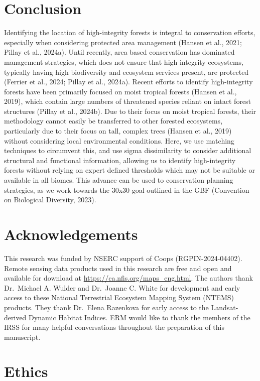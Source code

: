\documentclass[
]{agujournal2019}
\begin{document}
\section{Conclusion}\label{conclusion}

Identifying the location of high-integrity forests is integral to
conservation efforts, especially when considering protected area
management (Hansen et al., 2021; Pillay et al., 2024a). Until recently,
area based conservation has dominated management strategies, which does
not ensure that high-integrity ecosystems, typically having high
biodiversity and ecosystem services present, are protected (Ferrier et
al., 2024; Pillay et al., 2024a). Recent efforts to identify
high-integrity forests have been primarily focused on moist tropical
forests (Hansen et al., 2019), which contain large numbers of threatened
species reliant on intact forest structures (Pillay et al., 2024b). Due
to their focus on moist tropical forests, their methodology cannot
easily be transferred to other forested ecosystems, particularly due to
their focus on tall, complex trees (Hansen et al., 2019) without
considering local environmental conditions. Here, we use matching
techniques to circumvent this, and use sigma dissimilarity to consider
additional structural and functional information, allowing us to
identify high-integrity forests without relying on expert defined
thresholds which may not be suitable or available in all biomes. This
advance can be used to conservation planning strategies, as we work
towards the 30x30 goal outlined in the GBF (Convention on Biological
Diversity, 2023).

\section{Acknowledgements}\label{acknowledgements}

This research was funded by NSERC support of Coops (RGPIN-2024-04402).
Remote sensing data products used in this research are free and open and
available for download at \url{https://ca.nfis.org/maps_eng.html}. The
authors thank Dr.~Michael A. Wulder and Dr.~Joanne C. White for
development and early access to these National Terrestrial Ecosystem
Mapping System (NTEMS) products. They thank Dr.~Elena Razenkova for
early access to the Landsat-derived Dynamic Habitat Indices. ERM would
like to thank the members of the IRSS for many helpful conversations
throughout the preparation of this manuscript.

\section{Ethics}\label{ethics}
\end{document}
